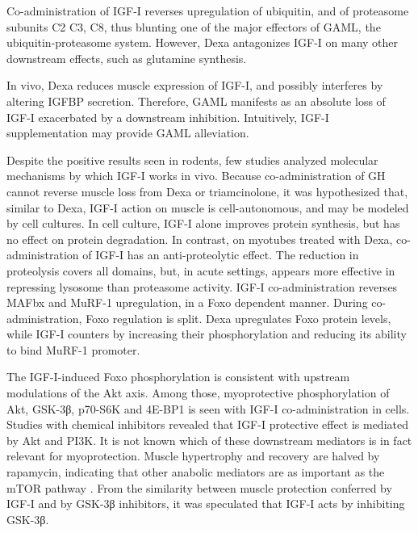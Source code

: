 \documentclass[12pt,english]{report}\usepackage[]{graphicx}\usepackage[]{color}
\begin{document}
Co-administration of IGF-I reverses upregulation of ubiquitin, and
of proteasome subunits C2 C3, C8\citep{chrysis2002divergent,chrysis1999regulation},
thus blunting one of the major effectors of GAML, the ubiquitin-proteasome
system. However, Dexa antagonizes IGF-I on many other downstream effects,
such as glutamine synthesis\citep{kimura2001insulin-like}.

In vivo, Dexa reduces muscle expression of IGF-I\citep{gayan-ramirez1999acute,inder2010dexamethasone},
and possibly interferes by altering IGFBP secretion\citep{wu2010redd1}.
Therefore, GAML manifests as an absolute loss of IGF-I exacerbated
by a downstream inhibition. Intuitively, IGF-I supplementation may
provide GAML alleviation.

Despite the positive results seen in rodents, few studies analyzed
molecular mechanisms by which IGF-I works in vivo. Because co-administration
of GH cannot reverse muscle loss from Dexa or triamcinolone\citep{petrof1995growth,chrysis1999regulation},
it was hypothesized that, similar to Dexa, IGF-I action on muscle
is cell-autonomous, and may be modeled by cell cultures. In cell culture,
IGF-I alone improves protein synthesis, but has no effect on protein
degradation\citep{quinn2007muscle-specific}. In contrast, on myotubes
treated with Dexa, co-administration of IGF-I has an anti-proteolytic
effect\citep{quinn2007muscle-specific}. The reduction in proteolysis
covers all domains, but, in acute settings, appears more effective
in repressing lysosome than proteasome activity\citep{li2004insulin-like}.
IGF-I co-administration reverses MAFbx and MuRF-1 upregulation\citep{sacheck2004igf-i,waddell2008glucocorticoid},
in a Foxo dependent manner. During co-administration, Foxo regulation
is split. Dexa upregulates Foxo protein levels, while IGF-I counters
by increasing their phosphorylation\citep{stitt2004igf-1/pi3k/akt}
and reducing its ability to bind MuRF-1 promoter\citep{waddell2008glucocorticoid}.

The IGF-I-induced Foxo phosphorylation is consistent with upstream
modulations of the Akt axis. Among those, myoprotective phosphorylation
of Akt, GSK-3β, p70-S6K and 4E-BP1 is seen with IGF-I co-administration
in cells\citep{li2005insulin-like,shah2000translational}. Studies
with chemical inhibitors revealed that IGF-I protective effect is
mediated by Akt and PI3K\citep{li2005insulin-like}. It is not known
which of these downstream mediators is in fact relevant for myoprotection.
Muscle hypertrophy and recovery are halved by rapamycin, indicating
that other anabolic mediators are as important as the mTOR pathway
\citep{pallafacchina2002protein,bodine2001akt/mtor,spangenburg2008functional}.
From the similarity between muscle protection conferred by IGF-I and
by GSK-3β inhibitors, it was speculated that IGF-I acts by inhibiting
GSK-3β\citep{evenson2005gsk-3beta,schakman2008role}.
\end{document}

